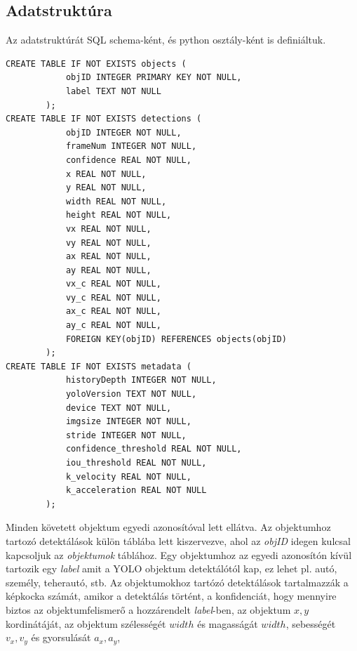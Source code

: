 \documentclass[acmtog, authorversion]{acmart}
\begin{document}
\subsection{Adatstruktúra}
Az adatstruktúrát SQL schema-ként, és python osztály-ként is definiáltuk.
\begin{verbatim}
CREATE TABLE IF NOT EXISTS objects (
            objID INTEGER PRIMARY KEY NOT NULL,
            label TEXT NOT NULL
        );
CREATE TABLE IF NOT EXISTS detections (
            objID INTEGER NOT NULL,
            frameNum INTEGER NOT NULL,
            confidence REAL NOT NULL,
            x REAL NOT NULL,
            y REAL NOT NULL,
            width REAL NOT NULL,
            height REAL NOT NULL,
            vx REAL NOT NULL,
            vy REAL NOT NULL,
            ax REAL NOT NULL,
            ay REAL NOT NULL,
            vx_c REAL NOT NULL,
            vy_c REAL NOT NULL,
            ax_c REAL NOT NULL,
            ay_c REAL NOT NULL,
            FOREIGN KEY(objID) REFERENCES objects(objID)
        );
CREATE TABLE IF NOT EXISTS metadata (
            historyDepth INTEGER NOT NULL,
            yoloVersion TEXT NOT NULL,   
            device TEXT NOT NULL,
            imgsize INTEGER NOT NULL,
            stride INTEGER NOT NULL,
            confidence_threshold REAL NOT NULL,
            iou_threshold REAL NOT NULL,
            k_velocity REAL NOT NULL,
            k_acceleration REAL NOT NULL
        );
\end{verbatim}
Minden követett objektum egyedi azonosítóval lett ellátva. Az objektumhoz tartozó detektálások külön táblába lett kiszervezve,
ahol az \textit{objID} idegen kulcsal kapcsoljuk az \textit{objektumok} táblához. Egy objektumhoz az egyedi azonosítón kívül
tartozik egy \textit{label} amit a YOLO objektum detektálótól kap, ez lehet pl. autó, személy, teherautó, stb. Az objektumokhoz
tartózó detektálások tartalmazzák a képkocka számát, amikor a detektálás történt, a konfidenciát, hogy mennyire biztos az
objektumfelismerő a hozzárendelt \textit{label}-ben, az objektum \begin{math}x,y\end{math} kordinátáját, az objektum szélességét
\begin{math}width\end{math} és magasságát \begin{math}width\end{math}, sebességét \begin{math}v_x,v_y\end{math} és gyorsulását \begin{math}a_x,a_y\end{math}, 
\end{document}
